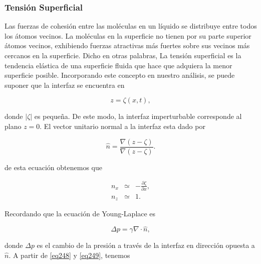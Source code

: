 
\subsubsection{Tensión Superficial}

Las fuerzas de cohesión entre las moléculas en un líquido se distribuye entre todos los átomos vecinos. La moléculas en la superficie no tienen por su parte superior átomos vecinos, exhibiendo fuerzas atractivas más fuertes sobre sus vecinos más cercanos en la superficie. Dicho en otras palabras, La tensión superficial es la tendencia elástica de una superficie fluida que hace que adquiera la menor superficie posible. Incorporando este concepto en nuestro análisis, se puede suponer que la interfaz se encuentra en
 
\begin{equation}\label{eq246}
   z = \zeta(x, t), 
\end{equation}

\noindent donde $|\zeta|$ es pequeña. De este modo, la interfaz imperturbable corresponde al plano $z = 0$. El vector unitario normal a la interfaz esta dado por

\begin{equation}\label{eq247}
    \hat{n} = \frac{\nabla (z -\zeta)}{\nabla (z-\zeta)}.
\end{equation}  

\noindent de esta ecuación obtenemos que

\begin{eqnarray}
   n_x & \simeq & - \frac{\partial \zeta}{\partial x}, \label{eq248}\\
   n_z & \simeq & 1. \label{eq249}
\end{eqnarray}

\noindent Recordando que la ecuación de Young-Laplace es

\begin{equation}\label{eq250}
   \Delta p = \gamma \nabla \cdot \hat{n},
\end{equation}

\noindent donde $\Delta p$ es el cambio de la presión a través de la interfaz en dirección opuesta a $\hat{n}$. A partir de \ref{eq248} y \ref{eq249}, tenemos

